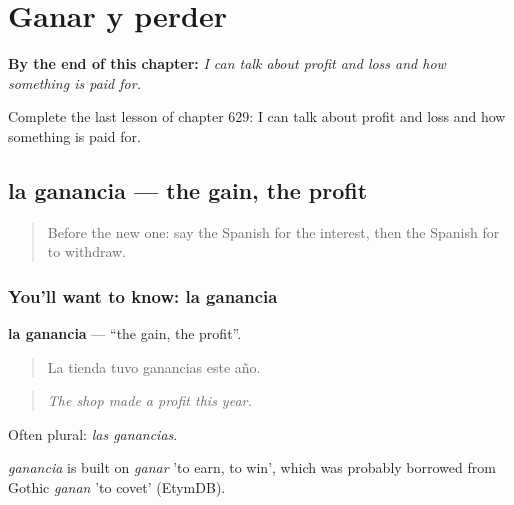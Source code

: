 
\chapter{Ganar y perder}
\label{ch:es-ganar-y-perder}

\begin{chapteropening}
\textbf{By the end of this chapter:} \emph{I can talk about profit and loss and how something is paid for.}

Complete the last lesson of chapter 629: I can talk about profit and loss and how something is paid for.
\end{chapteropening}

\section[la ganancia]{la ganancia — the gain, the profit}

\label{lesson:ES-C629-ganancia}



\begin{quote}
Before the new one: say the Spanish for the interest, then the Spanish for to withdraw.
\end{quote}

\subsection*{You'll want to know: la ganancia}
\textbf{la ganancia} — \textquotedblleft{}the gain, the profit\textquotedblright{}.

\begin{quote}
La tienda tuvo ganancias este año.
\end{quote}

\begin{quote}
\emph{The shop made a profit this year.}
\end{quote}

Often plural: \emph{las ganancias}.

\begin{cousinweb}
\emph{ganancia} is built on \emph{ganar} 'to earn, to win', which was probably borrowed from Gothic \emph{ganan} 'to covet' (EtymDB).
\end{cousinweb}

